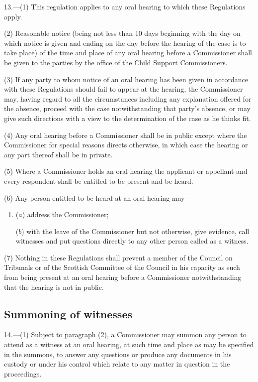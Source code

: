 \documentclass[a4paper]{article}
\begin{document}
13.—(1) This regulation applies to any oral hearing to which these Regulations apply.

(2) Reasonable notice (being not less than 10 days beginning with the day on which notice is given and ending on the day before the hearing of the case is to take place) of the time and place of any oral hearing before a Commissioner shall be given to the parties by the office of the Child Support Commissioners.

(3) If any party to whom notice of an oral hearing has been given in accordance with these Regulations should fail to appear at the hearing, the Commissioner may, having regard to all the circumstances including any explanation offered for the absence, proceed with the case notwithstanding that party’s absence, or may give such directions with a view to the determination of the case as he thinks fit.

(4) Any oral hearing before a Commissioner shall be in public except where the Commissioner for special reasons directs otherwise, in which case the hearing or any part thereof shall be in private.

(5) Where a Commissioner holds an oral hearing the applicant or appellant and every respondent shall be entitled to be present and be heard.

(6) Any person entitled to be heard at an oral hearing may—
\begin{enumerate}\item[]
($a$) address the Commissioner;

($b$) with the leave of the Commissioner but not otherwise, give evidence, call witnesses and put questions directly to any other person called as a witness.
\end{enumerate}

(7) Nothing in these Regulations shall prevent a member of the Council on Tribunals or of the Scottish Committee of the Council in his capacity as such from being present at an oral hearing before a Commissioner notwithstanding that the hearing is not in public.

\subsection[14. Summoning of witnesses]{Summoning of witnesses}

14.—(1) Subject to paragraph (2), a Commissioner may summon any person to attend as a witness at an oral hearing, at such time and place as may be specified in the summons, to answer any questions or produce any documents in his custody or under his control which relate to any matter in question in the proceedings.
\end{document}
